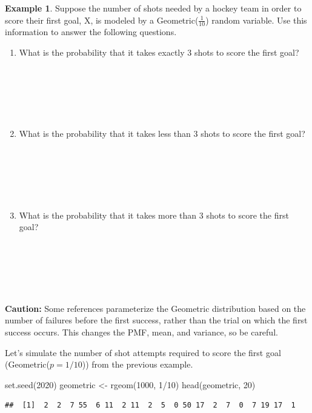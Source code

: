 \documentclass[
  11pt,
]{book}
\newenvironment{Shaded}{\begin{snugshade}}{\end{snugshade}}
\newcommand{\DecValTok}[1]{\textcolor[rgb]{0.00,0.00,0.81}{#1}}
\newcommand{\FunctionTok}[1]{\textcolor[rgb]{0.00,0.00,0.00}{#1}}
\newcommand{\NormalTok}[1]{#1}
\newcommand{\OtherTok}[1]{\textcolor[rgb]{0.56,0.35,0.01}{#1}}
\newcommand{\SpecialCharTok}[1]{\textcolor[rgb]{0.00,0.00,0.00}{#1}}
\theoremstyle{definition}
\theoremstyle{definition}
\newtheorem{example}{Example}[chapter]
\theoremstyle{definition}
\theoremstyle{definition}
\theoremstyle{remark}
\begin{document}
\begin{example}
Suppose the number of shots needed by a hockey team in order to score their first goal, X, is modeled by a Geometric(\(\frac{1}{10}\)) random variable. Use this information to answer the following questions.
\end{example}

\begin{enumerate}
\def\labelenumi{(\alph{enumi})}
\item
  What is the probability that it takes exactly 3 shots to score the first goal?\\
  \strut \\
  \strut \\
  \strut \\
\item
  What is the probability that it takes less than 3 shots to score the first goal?\\
  \strut \\
  \strut \\
  \strut \\
\item
  What is the probability that it takes more than 3 shots to score the first goal?\\
  \strut \\
  \strut \\
  \strut \\
\end{enumerate}

\textbf{Caution:} Some references parameterize the Geometric distribution based on the number of failures before the first success, rather than the trial on which the first success occurs. This changes the PMF, mean, and variance, so be careful.

Let's simulate the number of shot attempts required to score the first goal (Geometric(\(p=1/10\))) from the previous example.

\begin{Shaded}
\begin{Highlighting}[]
\FunctionTok{set.seed}\NormalTok{(}\DecValTok{2020}\NormalTok{)}
\NormalTok{geometric }\OtherTok{\textless{}{-}} \FunctionTok{rgeom}\NormalTok{(}\DecValTok{1000}\NormalTok{, }\DecValTok{1}\SpecialCharTok{/}\DecValTok{10}\NormalTok{)}
\FunctionTok{head}\NormalTok{(geometric, }\DecValTok{20}\NormalTok{)}
\end{Highlighting}
\end{Shaded}

\begin{verbatim}
##  [1]  2  2  7 55  6 11  2 11  2  5  0 50 17  2  7  0  7 19 17  1
\end{verbatim}
\end{document}
